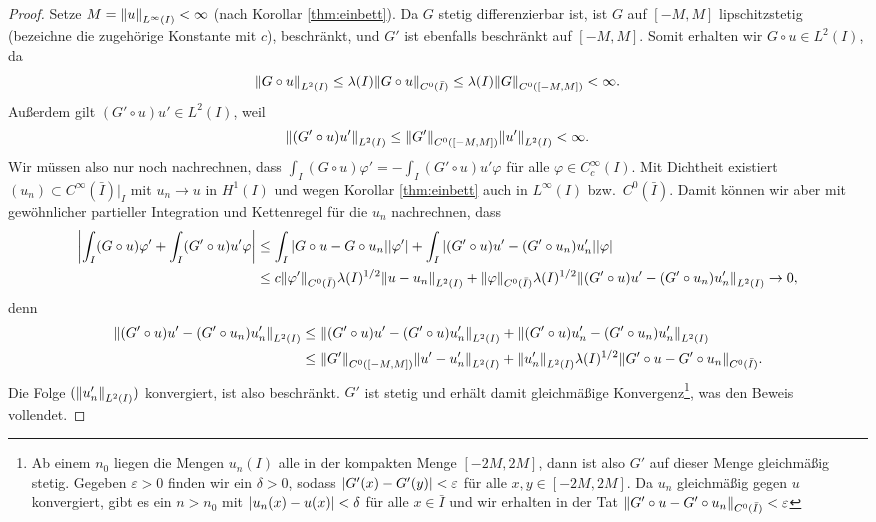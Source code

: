 \documentclass[twoside]{article}
\theoremstyle{definition}
\begin{document}
\begin{proof}
Setze $M = \norm{u}_{L^\infty(I)} < \infty$ (nach Korollar \ref{thm:einbett}). Da $G$ stetig differenzierbar ist, ist $G$ auf $[-M,M]$ lipschitzstetig (bezeichne die zugehörige Konstante mit $c$), beschränkt, und $G'$ ist ebenfalls beschränkt auf $[-M,M]$. Somit erhalten wir $G \circ u \in L^2(I)$, da 
\begin{align*}
\norm{G \circ u}_{L^2(I)} \leq \lambda(I) \norm{G \circ u}_{C^0(\bar{I})} \leq  \lambda(I) \norm{G}_{C^0([-M,M])} < \infty.
\end{align*}
Außerdem gilt $(G' \circ u) u' \in L^2(I)$, weil 
\begin{align*}
\norm{(G' \circ u) u'}_{L^2(I)} \leq \norm{G'}_{C^0([-M,M])} \norm{u'}_{L^2(I)} < \infty.
\end{align*}
Wir müssen also nur noch nachrechnen, dass $\int_I (G \circ u) \varphi' = - \int_I (G' \circ u) u' \varphi$ für alle $\varphi \in C_c^\infty(I)$. Mit Dichtheit existiert $(u_n) \subset C^\infty(\bar{I})\vert_I$ mit $u_n \to u$ in $H^1(I)$ und wegen Korollar \ref{thm:einbett} auch in $L^\infty(I)$ bzw.\ $C^0(\bar{I})$. Damit können wir aber mit gewöhnlicher partieller Integration und Kettenregel für die $u_n$ nachrechnen, dass
\begin{align*}
\abs{\int_I (G \circ u) \varphi' + \int_I (G' \circ u) u' \varphi} &\leq \int_I \abs{G \circ u - G \circ u_n} \abs{\varphi'} + \int_I \abs{(G' \circ u) u' - (G' \circ u_n) u_n'} \abs{\varphi}\\
&\leq c \norm{\varphi'}_{C^0(\bar{I})} \lambda(I)^{1/2} \norm{u-u_n}_{L^2(I)} + \norm{\varphi}_{C^0(\bar{I})} \lambda(I)^{1/2} \norm{(G' \circ u) u' - (G' \circ u_n) u_n'}_{L^2(I)}  \to 0,
\end{align*} 
denn 
\begin{align*}
\norm{(G' \circ u) u' - (G' \circ u_n) u_n'}_{L^2(I)} &\leq \norm{(G' \circ u) u' - (G' \circ u) u_n'}_{L^2(I)} + \norm{(G' \circ u) u_n' - (G' \circ u_n) u_n'}_{L^2(I)}\\
&\leq \norm{G'}_{C^0([-M,M])} \norm{u'-u_n'}_{L^2(I)} + \norm{u_n'}_{L^2(I)} \lambda(I)^{1/2} \norm{G' \circ u - G' \circ u_n}_{C^0(\bar{I})}.
\end{align*}
Die Folge $(\norm{u_n'}_{L^2(I)})$ konvergiert, ist also beschränkt. $G'$ ist stetig und erhält damit gleichmäßige Konvergenz\footnote{Ab einem $n_0$ liegen die Mengen $u_n(I)$ alle in der kompakten Menge $[-2M,2M]$, dann ist also $G'$ auf dieser Menge gleichmäßig stetig. Gegeben $\varepsilon> 0$ finden wir ein $\delta>0$, sodass $\abs{G'(x)-G'(y)} < \varepsilon$ für alle $x,y \in [-2M,2M]$. Da $u_n$ gleichmäßig gegen $u$ konvergiert, gibt es ein $ n> n_0$ mit $\abs{u_n(x)-u(x)}<\delta$ für alle $x \in \bar{I}$ und wir erhalten in der Tat $\norm{G'\circ u - G' \circ u_n}_{C^0(\bar{I})}<\varepsilon$}, was den Beweis vollendet. 
\end{proof}
\end{document}
